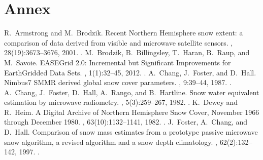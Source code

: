 \documentclass[letterpaper,10pt,english]{jupyterBook}
\begin{document}
\chapter{Annex}
\label{\detokenize{book/annex:annex}}\label{\detokenize{book/annex::doc}}
\begin{sphinxthebibliography}{10}
\sphinxAtStartPar
R. Armstrong and M. Brodzik. Recent Northern Hemisphere snow extent: a comparison of data derived from visible and microwave satellite sensors. , 28(19):3673–3676, 2001. .
\sphinxAtStartPar
M. Brodzik, B. Billingsley, T. Haran, B. Raup, and M. Savoie. EASE\sphinxhyphen{}Grid 2.0: Incremental but Significant Improvements for Earth\sphinxhyphen{}Gridded Data Sets. , 1(1):32–45, 2012. .
\sphinxAtStartPar
A. Chang, J. Foster, and D. Hall. Nimbus\sphinxhyphen{}7 SMMR derived global snow cover parameters. , 9:39–44, 1987. .
\sphinxAtStartPar
A. Chang, J. Foster, D. Hall, A. Rango, and B. Hartline. Snow water equivalent estimation by microwave radiometry. , 5(3):259–267, 1982. .
\sphinxAtStartPar
K. Dewey and R. Heim. A Digital Archive of Northern Hemisphere Snow Cover, November 1966 through December 1980. , 63(10):1132–1141, 1982. .
\sphinxAtStartPar
J. Foster, A. Chang, and D. Hall. Comparison of snow mass estimates from a prototype passive microwave snow algorithm, a revised algorithm and a snow depth climatology. , 62(2):132–142, 1997. .
\sphinxAtStartPar

\end{sphinxthebibliography}
\end{document}
